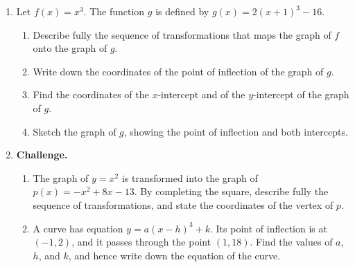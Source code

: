 \documentclass[12pt, twoside]{article}
\begin{document}
\begin{enumerate}[itemsep=0.55cm]
\newpage
\item[3.] Let $f(x)=x^3$. The function $g$ is defined by
$\displaystyle g(x)=2(x+1)^3-16$.

\begin{enumerate}[label=(\alph*), itemsep=0.3cm]
  \item Describe fully the sequence of transformations that maps the graph of
  $f$ onto the graph of $g$.
  \item Write down the coordinates of the point of inflection of the graph of $g$.
  \item Find the coordinates of the $x$-intercept and of the $y$-intercept of the
  graph of $g$.
  \item Sketch the graph of $g$, showing the point of inflection and both
  intercepts.
\end{enumerate}

\item[4.] \textbf{Challenge.}

\begin{enumerate}[label=(\alph*), itemsep=0.3cm]
  \item The graph of $y=x^2$ is transformed into the graph of
  $\displaystyle p(x)=-x^2+8x-13$. By completing the square, describe fully the
  sequence of transformations, and state the coordinates of the vertex of $p$.
  \item A curve has equation $y=a(x-h)^3+k$. Its point of inflection is at
  $(-1,2)$, and it passes through the point $(1,18)$. Find the values of $a$,
  $h$, and $k$, and hence write down the equation of the curve.
\end{enumerate}

\end{enumerate}
\end{document}
